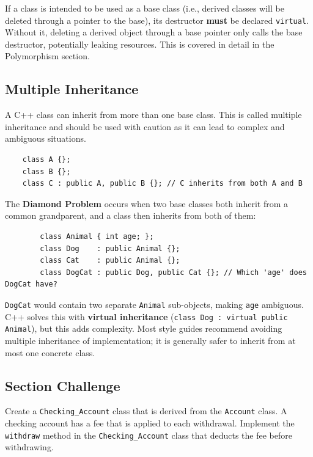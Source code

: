 \begin{remark}
	If a class is intended to be used as a base class (i.e., derived classes will be deleted through a pointer to the base), its destructor \textbf{must} be declared \texttt{virtual}. Without it, deleting a derived object through a base pointer only calls the base destructor, potentially leaking resources. This is covered in detail in the Polymorphism section.
\end{remark}

\subsection{Multiple Inheritance}
A C++ class can inherit from more than one base class. This is called multiple inheritance and should be used with caution as it can lead to complex and ambiguous situations.
\begin{lstlisting}
	class A {};
	class B {};
	class C : public A, public B {}; // C inherits from both A and B
\end{lstlisting}

\begin{remark}
	The \textbf{Diamond Problem} occurs when two base classes both inherit from a common grandparent, and a class then inherits from both of them:
	\begin{lstlisting}
		class Animal { int age; };
		class Dog    : public Animal {};
		class Cat    : public Animal {};
		class DogCat : public Dog, public Cat {}; // Which 'age' does DogCat have?
	\end{lstlisting}
	\texttt{DogCat} would contain two separate \texttt{Animal} sub-objects, making \texttt{age} ambiguous. C++ solves this with \textbf{virtual inheritance} (\texttt{class Dog : virtual public Animal}), but this adds complexity. Most style guides recommend avoiding multiple inheritance of implementation; it is generally safer to inherit from at most one concrete class.
\end{remark}

\subsection{Section Challenge}
Create a \texttt{Checking\_Account} class that is derived from the \texttt{Account} class. A checking account has a fee that is applied to each withdrawal. Implement the \texttt{withdraw} method in the \texttt{Checking\_Account} class that deducts the fee before withdrawing.

